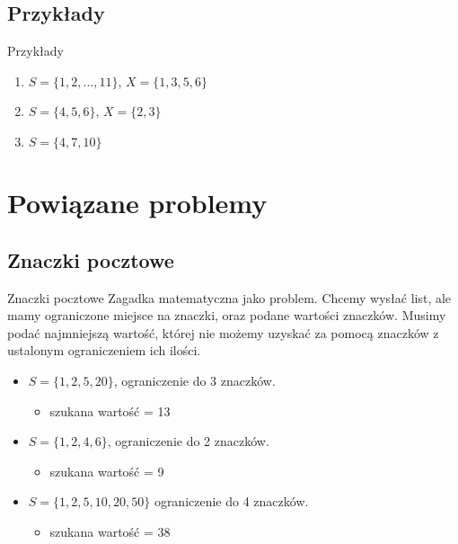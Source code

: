 \documentclass{beamer}
\begin{document}
	\subsection{Przykłady}
		\begin{frame}{Przykłady}
			\begin{enumerate}
				\item $ S = \lbrace 1,2,...,11 \rbrace $, $ X = \lbrace 1,3,5,6 \rbrace $
				\pause \item $ S = \lbrace 4,5,6 \rbrace $, $ X = \lbrace 2,3 \rbrace $
				\pause \item $ S =  \lbrace 4,7,10 \rbrace $
			\end{enumerate}
								
		\end{frame}
		
\section{Powiązane problemy}
	\subsection{Znaczki pocztowe}
		\begin{frame}
			\begin{block}{Znaczki pocztowe}
                Zagadka matematyczna jako problem.
                Chcemy wysłać list, ale mamy ograniczone miejsce na znaczki, oraz podane wartości znaczków.
                Musimy podać najmniejszą wartość, której nie możemy uzyskać za pomocą znaczków z ustalonym ograniczeniem ich ilości.
                \begin{itemize}
				    \pause \item $ S = \lbrace 1, 2, 5, 20 \rbrace $, ograniczenie do 3 znaczków.
                        \begin{itemize}
                            \item szukana wartość = 13
                        \end{itemize}
				    \pause \item $ S = \lbrace 1, 2, 4, 6 \rbrace $, ograniczenie do 2 znaczków.
                        \begin{itemize}
                            \item szukana wartość = 9
                        \end{itemize}
				    \pause \item $ S =  \lbrace 1, 2, 5, 10, 20, 50 \rbrace $ ograniczenie do 4 znaczków.
                        \begin{itemize}
                            \item szukana wartość = 38
                        \end{itemize}
                \end{itemize}
			\end{block}
		\end{frame}
		
\end{document}
